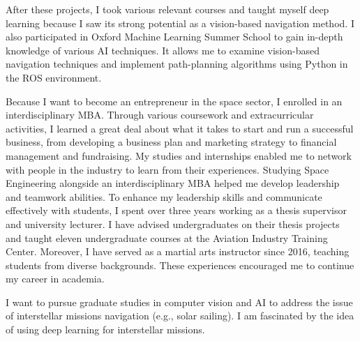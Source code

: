 \documentclass[a4,25pt]{article}
\begin{document}
\begin{large}
\vspace{-0.25cm}\quad After these projects, I took various relevant courses and taught myself deep learning because I saw its strong potential as a vision-based navigation method. I also participated in Oxford Machine Learning Summer School to gain in-depth knowledge of various AI techniques. It allows me to examine vision-based navigation techniques and implement path-planning algorithms using Python in the ROS environment. \par
\vspace{-0.25cm}\quad Because I want to become an entrepreneur in the space sector, I enrolled in an interdisciplinary MBA. Through various coursework and extracurricular activities, I learned a great deal about what it takes to start and run a successful business, from developing a business plan and marketing strategy to financial management and fundraising. My studies and internships enabled me to network with people in the industry to learn from their experiences. Studying Space Engineering alongside an interdisciplinary MBA helped me develop leadership and teamwork abilities. To enhance my leadership skills and communicate effectively with students, I spent over three years working as a thesis supervisor and university lecturer. I have advised undergraduates on their thesis projects and taught eleven undergraduate courses at the Aviation Industry Training Center. Moreover, I have served as a martial arts instructor since 2016, teaching students from diverse backgrounds. These experiences encouraged me to continue my career in academia. \par
\vspace{-0.25cm}\quad 
I want to pursue graduate studies in computer vision and AI to address the issue of interstellar missions navigation (e.g., solar sailing). I am fascinated by the idea of using deep learning for interstellar missions. 

\end{large}
\end{document}
